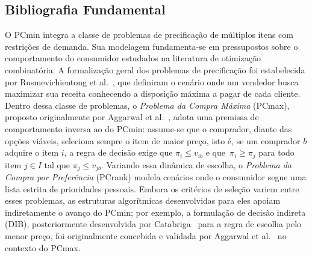 \subsection{Bibliografia Fundamental}

O PCmin integra a classe de problemas de precificação de múltiplos itens com restrições de demanda. Sua modelagem fundamenta-se em pressupostos sobre o comportamento do consumidor estudados na literatura de otimização combinatória. A formalização geral dos problemas de precificação foi estabelecida por Rusmevichientong et al.~\cite{rusmevichientong2006}, que definiram o cenário onde um vendedor busca maximizar sua receita conhecendo a disposição máxima a pagar de cada cliente. Dentro dessa classe de problemas, o \emph{Problema da Compra Máxima} (PCmax), proposto originalmente por Aggarwal et al.~\cite{aggarwal2004}, adota uma premissa de comportamento inversa ao do PCmin: assume-se que o comprador, diante das opções viáveis, seleciona sempre o item de maior preço, isto é, se um comprador $b$ adquire o item $i$, a regra de decisão exige que $\pi_i \le v_{ib}$ e que~$\pi_i \ge \pi_j$ para todo item $j \in I$ tal que $\pi_j \le v_{jb}$. Variando essa dinâmica de escolha, o \emph{Problema da Compra por Preferência} (PCrank) modela cenários onde o consumidor segue uma lista estrita de prioridades pessoais. Embora os critérios de seleção variem entre esses problemas, as estruturas algorítmicas desenvolvidas para eles apoiam indiretamente o avanço do PCmin; por exemplo, a formulação de decisão indireta (DIB), posteriormente desenvolvida por Catabriga~\cite{catabriga2025} para a regra de escolha pelo menor preço, foi originalmente concebida e validada por Aggarwal et al.~\cite{aggarwal2004} no contexto do PCmax.


